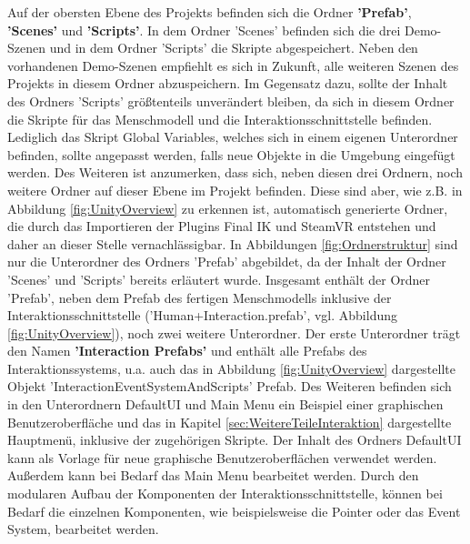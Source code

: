 Auf der obersten Ebene des Projekts befinden sich die Ordner \textbf{'Prefab'}, \textbf{'Scenes'} und \textbf{'Scripts'}. In dem Ordner 'Scenes' befinden sich die drei Demo-Szenen und in dem Ordner 'Scripts' die Skripte abgespeichert. Neben den vorhandenen Demo-Szenen empfiehlt es sich in Zukunft, alle weiteren Szenen des Projekts in diesem Ordner abzuspeichern. Im Gegensatz dazu, sollte der Inhalt des Ordners 'Scripts' größtenteils unverändert bleiben, da sich in diesem Ordner die Skripte für das Menschmodell und die Interaktionsschnittstelle befinden. Lediglich das Skript Global Variables, welches sich in einem eigenen Unterordner befinden, sollte angepasst werden, falls neue Objekte in die Umgebung eingefügt werden. Des Weiteren ist anzumerken, dass sich, neben diesen drei Ordnern, noch weitere Ordner auf dieser Ebene im Projekt befinden. Diese sind aber, wie z.B. in Abbildung \ref{fig:UnityOverview} zu erkennen ist, automatisch generierte Ordner, die durch das Importieren der Plugins Final IK und SteamVR entstehen und daher an dieser Stelle vernachlässigbar. 
\newline
In Abbildungen \ref{fig:Ordnerstruktur} sind nur die Unterordner des Ordners 'Prefab' abgebildet, da der Inhalt der Ordner 'Scenes' und 'Scripts' bereits erläutert wurde. Insgesamt enthält der Ordner 'Prefab', neben dem Prefab des fertigen Menschmodells inklusive der Interaktionsschnittstelle ('Human+Interaction.prefab', vgl. Abbildung \ref{fig:UnityOverview}), noch zwei weitere Unterordner.
Der erste Unterordner trägt den Namen \textbf{'Interaction Prefabs'} und enthält alle Prefabs des Interaktionssystems, u.a. auch das in Abbildung \ref{fig:UnityOverview} dargestellte Objekt 'InteractionEventSystemAndScripts' Prefab. Des Weiteren befinden sich in den Unterordnern DefaultUI und Main Menu ein Beispiel einer graphischen Benutzeroberfläche und das in Kapitel \ref{sec:WeitereTeileInteraktion} dargestellte Hauptmenü, inklusive der zugehörigen Skripte. Der Inhalt des Ordners DefaultUI kann als Vorlage für neue graphische Benutzeroberflächen verwendet werden. Außerdem kann bei Bedarf das Main Menu bearbeitet werden. Durch den modularen Aufbau der Komponenten der Interaktionsschnittstelle, können bei Bedarf die einzelnen Komponenten, wie beispielsweise die Pointer oder das Event System, bearbeitet werden.
